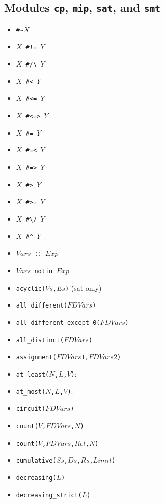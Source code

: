 \documentclass[10pt]{article}
\begin{document}
\begin{multicols}{2}
\section*{Modules \texttt{cp}, \texttt{mip}, \texttt{sat}, and \texttt{smt}}
\begin{scriptsize}
\begin{itemize}
    \item {\tt \verb+#~+$X$}
    \item {\tt $X$ \verb+#!=+ $Y$} 
    \item {\tt $X$ \verb+#/\+ $Y$}
    \item {\tt $X$ \verb+#<+ $Y$} 
    \item {\tt $X$ \verb+#<=+ $Y$}
    \item {\tt $X$ \verb+#<=>+ $Y$}
    \item {\tt $X$ \verb+#=+ $Y$} 
    \item {\tt $X$ \verb+#=<+ $Y$} 
    \item {\tt $X$ \verb+#=>+ $Y$}
    \item {\tt $X$ \verb+#>+ $Y$} 
    \item {\tt $X$ \verb+#>=+ $Y$} 
    \item {\tt $X$ \verb+#\/+ $Y$}
    \item {\tt $X$ \verb+#^+ $Y$}
\item \texttt{$Vars$ :: $Exp$}
\item \texttt{$Vars$ notin $Exp$}
\item \texttt{acyclic($Vs$,$Es$)} (sat only)
\item \texttt{all\_different($FDVars$)}
\item \texttt{all\_different\_except\_0($FDVars$)}
\item \texttt{all\_distinct($FDVars$)}
\item \texttt{assignment($FDVars1$,$FDVars2$)}
\item \texttt{at\_least($N$,$L$,$V$)}:
\item \texttt{at\_most($N$,$L$,$V$)}: 
\item \texttt{circuit($FDVars$)}
\item \texttt{count($V$,$FDVars$,$N$)}
\item \texttt{count($V$,$FDVars$,$Rel$,$N$)}
\item \texttt{cumulative($Ss$,$Ds$,$Rs$,$Limit$)}
\item \texttt{decreasing($L$)}
\item \texttt{decreasing\_strict($L$)}

\end{itemize}
\end{scriptsize}
\end{multicols}
\end{document}
